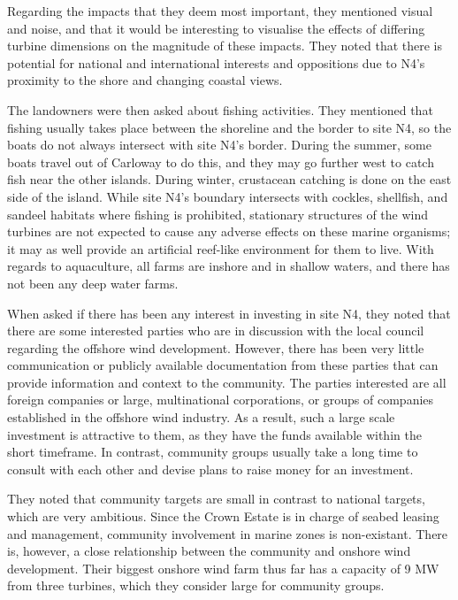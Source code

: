 Regarding the impacts that they deem most important, they mentioned visual and noise, and that it would be interesting to visualise the effects of differing turbine dimensions on the magnitude of these impacts. They noted that there is potential for national and international interests and oppositions due to N4's proximity to the shore and changing coastal views.

The landowners were then asked about fishing activities. They mentioned that fishing usually takes place between the shoreline and the border to site N4, so the boats do not always intersect with site N4's border. During the summer, some boats travel out of Carloway to do this, and they may go further west to catch fish near the other islands. During winter, crustacean catching is done on the east side of the island. While site N4's boundary intersects with cockles, shellfish, and sandeel habitats where fishing is prohibited, stationary structures of the wind turbines are not expected to cause any adverse effects on these marine organisms; it may as well provide an artificial reef-like environment for them to live. With regards to aquaculture, all farms are inshore and in shallow waters, and there has not been any deep water farms.

When asked if there has been any interest in investing in site N4, they noted that there are some interested parties who are in discussion with the local council regarding the offshore wind development. However, there has been very little communication or publicly available documentation from these parties that can provide information and context to the community. The parties interested are all foreign companies or large, multinational corporations, or groups of companies established in the offshore wind industry. As a result, such a large scale investment is attractive to them, as they have the funds available within the short timeframe. In contrast, community groups usually take a long time to consult with each other and devise plans to raise money for an investment.

They noted that community targets are small in contrast to national targets, which are very ambitious. Since the Crown Estate is in charge of seabed leasing and management, community involvement in marine zones is non-existant. There is, however, a close relationship between the community and onshore wind development. Their biggest onshore wind farm thus far has a capacity of 9 MW from three turbines, which they consider large for community groups.


